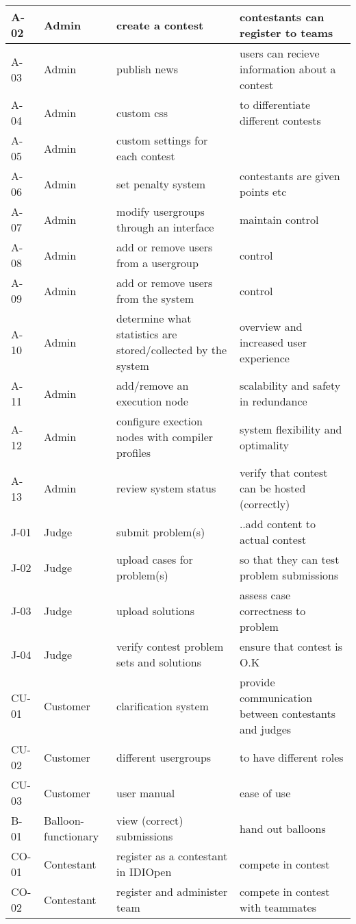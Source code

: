 \begin{longtable}{|p{}|p{}|p{}|p{}|}
\hline
A-02&Admin &create a contest &contestants can register to teams\\
\hline
A-03&Admin&publish news&users can recieve information about a contest \\
\hline
A-04&Admin&custom css & to differentiate different contests\\
\hline
A-05&Admin&custom settings for each contest & \\
\hline
A-06&Admin&set penalty system&contestants are given points etc\\
\hline
A-07&Admin&modify usergroups through an interface&maintain control\\
\hline
A-08&Admin&add or remove users from a usergroup&control\\
\hline
A-09&Admin&add or remove users from the system&control\\
\hline
A-10&Admin&determine what statistics are stored/collected by the system&overview and increased user experience\\
\hline
A-11&Admin&add/remove an execution node&scalability and safety in redundance\\
\hline
A-12&Admin&configure exection nodes with compiler profiles&system flexibility and optimality\\
\hline
A-13&Admin&review system status&verify that contest can be hosted (correctly)\\
\hline
J-01&Judge&submit problem(s)&..add content to actual contest\\
\hline
J-02&Judge&upload cases for problem(s)&so that they can test problem submissions\\
\hline
J-03&Judge&upload solutions&assess case correctness to problem\\
\hline
J-04&Judge&verify contest problem sets and solutions&ensure that contest is O.K\\
\hline
CU-01&Customer&clarification system&provide communication between contestants and judges\\
\hline
CU-02&Customer& different usergroups&to have different roles\\
\hline
CU-03&Customer&user manual&ease of use\\
\hline
B-01&Balloon-functionary&view (correct) submissions&hand out balloons\\
\hline
CO-01&Contestant&register as a contestant in IDIOpen&compete in contest\\
\hline
CO-02&Contestant&register and administer team&compete in contest with teammates\\

\end{longtable}
